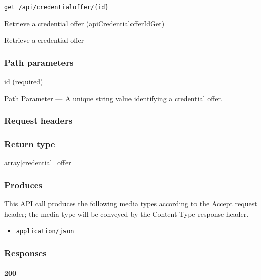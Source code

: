 \protect\hypertarget{apiCredentialofferIdGet}{}{}

\begin{verbatim}
get /api/credentialoffer/{id}
\end{verbatim}

Retrieve a credential offer ({apiCredentialofferIdGet})

Retrieve a credential offer

\hypertarget{path-parameters-20}{%
\subsubsection{Path parameters}\label{path-parameters-20}}

id (required)

{Path Parameter} --- A unique string value identifying a credential
offer.

\hypertarget{request-headers-18}{%
\subsubsection{Request headers}\label{request-headers-18}}

\hypertarget{return-type-29}{%
\subsubsection{Return type}\label{return-type-29}}

array{[}\protect\hyperlink{credential_offer}{credential\_offer}{]}

\hypertarget{produces-37}{%
\subsubsection{Produces}\label{produces-37}}

This API call produces the following media types according to the
{Accept} request header; the media type will be conveyed by the
{Content-Type} response header.

\begin{itemize}
\tightlist
\item
  \texttt{application/json}
\end{itemize}

\hypertarget{responses-37}{%
\subsubsection{Responses}\label{responses-37}}

\hypertarget{section-124}{%
\paragraph{200}\label{section-124}}

